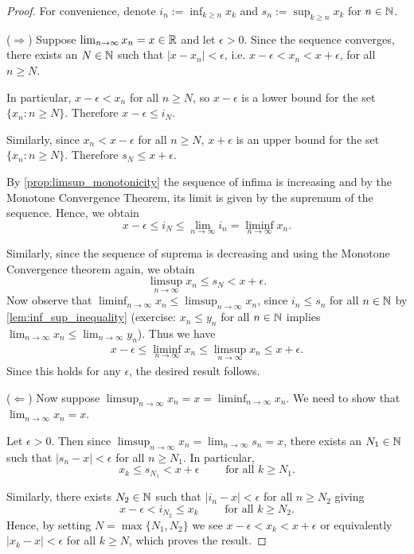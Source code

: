 \documentclass{article}
\begin{document}
\begin{proof}
For convenience, denote $i_n := \inf_{k\geq n} x_k$ and $s_n :=  \sup_{k\geq n} x_k$ for $n\in {\mathbb{N}}$.


($\Rightarrow$) Suppose $\lim_{n\to \infty} x_n = x\in {\mathbb{R}}$ and let $\epsilon>0$. Since the sequence converges, there exists an $N\in {\mathbb{N}}$ such that $\vert x-x_n\vert <\epsilon$, i.e. $x-\epsilon<x_n<x+\epsilon$, for all $n\geq N$. 

In particular, $x-\epsilon<x_n$ for all $n\geq N$, so $x-\epsilon$ is a lower bound for the set $\{x_n \colon n\geq N\}$. Therefore $x-\epsilon\leq i_N$. 

Similarly, since $x_n<x - \epsilon$ for all $n\geq N$, $x+\epsilon$ is an upper bound for the set $\{x_n \colon n\geq N\}$. Therefore $s_N \leq x + \epsilon$. 

By \cref{prop:limsup_monotonicity} the sequence of infima is increasing and by the Monotone Convergence Theorem, its limit is given by the supremum of the sequence. Hence, we obtain 
$$x-\epsilon\leq i_N \leq \lim_{n \to \infty} i_n =  \liminf_{n\to \infty} x_n.$$ 

Similarly, since the sequence of suprema is decreasing and using the Monotone Convergence theorem again, we obtain 
$$\limsup_{n\to \infty} x_n\leq s_N<x+\epsilon.$$
Now observe that $\liminf_{n\to \infty} x_n\leq \limsup_{n\to \infty} x_n $, since $i_n\leq s_n$ for all $n\in {\mathbb{N}}$ by \cref{lem:inf_sup_inequality} (exercise: $x_n \leq y_n$ for all $n \in {\mathbb{N}}$ implies $\lim_{n\to \infty} x_n \leq \lim_{n\to \infty} y_n$). Thus we have
\begin{align*}
    x-\epsilon \leq \liminf_{n\to \infty}x_n \leq \limsup_{n\to \infty} x_n \leq x+\epsilon.
\end{align*}
Since this holds for any $\epsilon$, the desired result follows.

($\Leftarrow$) Now suppose $\limsup_{n\to \infty} x_n= x =\liminf_{n\to \infty} x_n$. We need to show that $\lim_{n\to\infty} x_n = x$. 

Let $\epsilon>0$. Then since $\limsup_{n\to \infty} x_n = \lim_{n\to \infty} s_n= x$, there exists an $N_1\in {\mathbb{N}}$ such that $\vert s_n - x\vert <\epsilon$ for all $n\geq N_1$. In particular, 
$$x_k \leq s_{N_1} < x+\epsilon \qquad \text{ for all } k\geq N_1.$$ 

Similarly, there exists $N_2\in {\mathbb{N}}$ such that $\vert i_n - x\vert <\epsilon$ for all $n\geq N_2$ giving 
$$x-\epsilon< i_{N_2} \leq x_k  \qquad \text{ for all } k\geq N_2.$$ Hence, by setting $N= \max\{N_1,N_2\}$ we see $x-\epsilon < x_k < x+ \epsilon$ or equivalently $\vert x_k - x\vert < \epsilon$ for all $k\geq N$, which proves the result. 
\end{proof}
\end{document}
